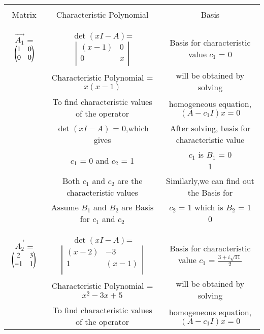\begin{table*}[!ht]
\begin{center}
\begin{tabular}{|c|c|c|}
\hline
& &\\
Matrix & Characteristic Polynomial & Basis\\
& &\\
\hline
& &\\
$\vec{A_1}$ = $\begin{pmatrix}1&0\\
                     0&0\end{pmatrix}$ 
& $\det(xI-A)$= $\left|
                \begin{array}{ccc}
                (x-1) & 0\\
                0 & x\\
                \end{array}
                \right|$ & Basis for characteristic value $c_1$ = 0 \\
& Characteristic Polynomial = $x(x-1)$ & will be obtained by solving\\
& To find characteristic values of the operator& homogeneous equation,$(A-c_1I)x = 0$\\
& $\det(xI-A)$ = 0,which gives & After solving, basis for characteristic value\\
& $c_1$ = 0 and $c_2$ = 1 & $c_1$ is $B_1$ = \myvec{0\\1}\\
& Both $c_1$ and $c_2$ are the characteristic values & Similarly,we can find out the Basis for\\
& Assume $B_1$ and $B_2$ are Basis for $c_1$ and $c_2$ & $c_2$ = 1 which is $B_2$ = \myvec{1\\0} \\
& &\\
\hline
& & \\
$\vec{A_2}$ = $\begin{pmatrix}2&3\\
                     -1&1\end{pmatrix}$ 
& $\det(xI-A)$= $\left|
                \begin{array}{ccc}
                (x-2) & -3\\
                1 & (x-1)\\
                \end{array}
                \right|$ & Basis for characteristic value $c_1$ = $\frac{3+i\sqrt{11}}{2}$\\
& Characteristic Polynomial = $x^2-3x+5$ & will be obtained by solving\\
& To find characteristic values of the operator& homogeneous equation,$(A-c_1I)x = 0$\\

\end{tabular}
\end{center}
\end{table*}
